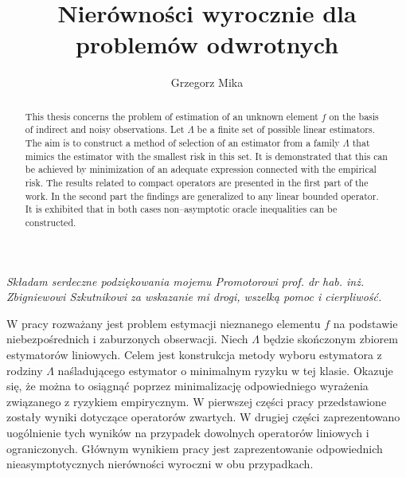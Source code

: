 \documentclass[man,mfiu]{mgrwms}
\begin{document}
\title{Nierówności wyrocznie dla problemów odwrotnych}
\author{Grzegorz Mika}

\maketitle
\newpage
\begin{minipage}[t]{0.5\textwidth}
\end{minipage}
\begin{minipage}[t]{0.5\textwidth}
\end{minipage}
\begin{flushright}
\vfill
\textit{Składam serdeczne podziękowania mojemu Promotorowi prof. dr hab. inż. Zbigniewowi Szkutnikowi za wskazanie mi drogi, wszelką pomoc  i cierpliwość.}
\end{flushright}
\tableofcontents
\begin{streszczenie}
W pracy rozważany jest problem estymacji nieznanego elementu $f$ na podstawie niebezpośrednich i zaburzonych obserwacji. Niech $\Lambda$ będzie skończonym zbiorem estymatorów liniowych. Celem jest konstrukcja metody wyboru estymatora z rodziny $\Lambda$ naśladującego estymator o minimalnym ryzyku w tej klasie. Okazuje się, że można to osiągnąć poprzez minimalizację odpowiedniego wyrażenia związanego z ryzykiem empirycznym. W pierwszej części pracy przedstawione zostały wyniki dotyczące operatorów zwartych. W drugiej części zaprezentowano uogólnienie tych wyników  na przypadek dowolnych operatorów liniowych i ograniczonych. Głównym wynikiem pracy jest zaprezentowanie odpowiednich nieasymptotycznych nierówności wyroczni w obu przypadkach.
\end{streszczenie}

\begin{abstract}
This thesis concerns the problem of estimation of an unknown element $f$ on the basis of indirect and noisy observations. Let $\Lambda$ be a finite set of possible linear estimators. The aim is to construct a method of selection of an estimator from a family $\Lambda$ that mimics the estimator with the smallest risk in this set. It is demonstrated that this can be achieved by minimization of an adequate expression connected with the empirical risk. The results related to compact operators are presented in the first part of the work. In the second part the findings are generalized to any linear bounded operator. It is exhibited that in both cases non--asymptotic oracle inequalities can be constructed.

\end{abstract}
\end{document}
